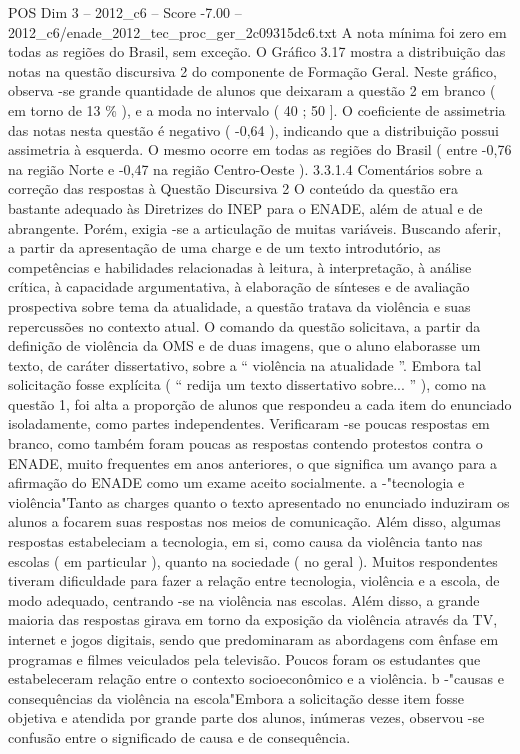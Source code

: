 \begin{textsample}{POS Dim 3 – 2012\_c6 – Score -7.00 – 2012\_c6/enade\_2012\_tec\_proc\_ger\_2c09315dc6.txt}
A nota mínima foi zero em todas as regiões do Brasil, sem exceção.
O Gráfico 3.17 mostra a distribuição das notas na questão discursiva 2 do componente de Formação Geral.
Neste gráfico, observa -se grande quantidade de alunos que deixaram a questão 2 em branco ( em torno de 13 \% ), e a moda no intervalo ( 40 ; 50 ].
O coeficiente de assimetria das notas nesta questão é negativo ( -0,64 ), indicando que a distribuição possui assimetria à esquerda.
O mesmo ocorre em todas as regiões do Brasil ( entre -0,76 na região Norte e -0,47 na região Centro-Oeste ). 3.3.1.4 Comentários sobre a correção das respostas à Questão Discursiva 2 O conteúdo da questão era bastante adequado às Diretrizes do INEP para o ENADE, além de atual e de abrangente.
Porém, exigia -se a articulação de muitas variáveis.
Buscando aferir, a partir da apresentação de uma charge e de um texto introdutório, as competências e habilidades relacionadas à leitura, à interpretação, à análise crítica, à capacidade argumentativa, à elaboração de sínteses e de avaliação prospectiva sobre tema da atualidade, a questão tratava da violência e suas repercussões no contexto atual.
O comando da questão solicitava, a partir da definição de violência da OMS e de duas imagens, que o aluno elaborasse um texto, de caráter dissertativo, sobre a “ violência na atualidade ”.
Embora tal solicitação fosse explícita ( “ redija um texto dissertativo sobre... ” ), como na questão 1, foi alta a proporção de alunos que respondeu a cada item do enunciado isoladamente, como partes independentes.
Verificaram -se poucas respostas em branco, como também foram poucas as respostas contendo protestos contra o ENADE, muito frequentes em anos anteriores, o que significa um avanço para a afirmação do ENADE como um exame aceito socialmente. a -"tecnologia e violência"Tanto as charges quanto o texto apresentado no enunciado induziram os alunos a focarem suas respostas nos meios de comunicação.
Além disso, algumas respostas estabeleciam a tecnologia, em si, como causa da violência tanto nas escolas ( em particular ), quanto na sociedade ( no geral ).
Muitos respondentes tiveram dificuldade para fazer a relação entre tecnologia, violência e a escola, de modo adequado, centrando -se na violência nas escolas.
Além disso, a grande maioria das respostas girava em torno da exposição da violência através da TV, internet e jogos digitais, sendo que predominaram as abordagens com ênfase em programas e filmes veiculados pela televisão.
Poucos foram os estudantes que estabeleceram relação entre o contexto socioeconômico e a violência. b -"causas e consequências da violência na escola"Embora a solicitação desse item fosse objetiva e atendida por grande parte dos alunos, inúmeras vezes, observou -se confusão entre o significado de causa e de consequência.

\end{textsample}
